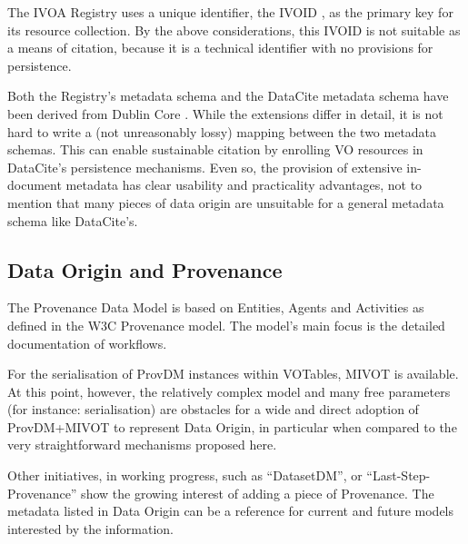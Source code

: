 \documentclass[11pt,a4paper]{ivoa}
\begin{document}
The IVOA Registry uses a unique identifier, the IVOID
\citep{2016ivoa.spec.0523D}, as the primary key for its resource
collection.  By the above considerations, this IVOID is not suitable as a means of citation, because it is a technical identifier with no provisions for persistence.

Both the Registry's metadata schema and the DataCite
\citep{std:DataCite40} metadata schema have been
derived from Dublin Core \citep{std:DUBLINCORE}.  While the extensions differ in detail, it is not
hard to write a (not unreasonably lossy) mapping between the two metadata schemas.  This can enable
sustainable citation by enrolling VO resources in DataCite's persistence
mechanisms.  Even so, the provision of extensive in-document metadata
has clear usability and practicality advantages, not to mention that many
pieces of data origin are unsuitable for a general metadata schema like
DataCite's.

\subsection{Data Origin and Provenance}

The Provenance Data Model \citep{2020ivoa.spec.0411S} is based on Entities, Agents and Activities as defined in the W3C Provenance model. The model's main focus is the detailed documentation of workflows.

For the serialisation of ProvDM instances within VOTables, MIVOT \citep{2023ivoa.spec.0620M} is available.  At this point, however, the relatively complex model and many free parameters (for instance: serialisation) are obstacles for a wide and direct adoption of ProvDM+MIVOT to represent Data Origin, in particular when compared to the very straightforward mechanisms proposed here.


Other initiatives, in working progress, such as ``DatasetDM'', or 
``Last-Step-Provenance'' show the growing interest of adding a piece of 
Provenance. The metadata listed in Data Origin can be a reference for current
and future models interested by the information.
\end{document}
